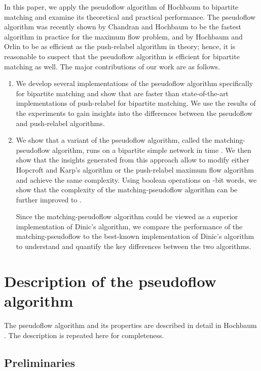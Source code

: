 \documentclass{article}
\newcounter{contribution}
\begin{document}
In this paper, we apply the pseudoflow algorithm of Hochbaum \cite{Hoc97, Hoc07} to bipartite matching and examine its theoretical and practical performance.  The pseudoflow algorithm was recently shown by Chandran and Hochbaum \cite{ChaH07} to be the fastest algorithm in practice for the maximum flow problem, and by Hochbaum and Orlin to be as efficient as the push-relabel algorithm in theory; hence, it is reasonable to suspect that the pseudoflow algorithm is efficient for bipartite matching as well.  The major contributions of our work are as follows.
\begin{enumerate}
\item We develop several implementations of the pseudoflow algorithm specifically for bipartite matching and show that are faster than state-of-the-art implementations of push-relabel for bipartite matching.  We use the results of the experiments to gain insights into the differences between the pseudoflow and push-relabel algorithms. 
\item We show that a variant of the pseudoflow algorithm, called the {\sf matching-pseudoflow} algorithm, runs on a bipartite simple network in time . We then show that the insights generated from this approach allow to modify either Hopcroft and Karp's algorithm or the push-relabel maximum flow algorithm and achieve the same complexity.  Using boolean operations on -bit words, we show that the complexity of the {\sf matching-pseudoflow} algorithm can be further improved to .

Since the {\sf matching-pseudoflow} algorithm could be viewed as a superior implementation of Dinic's algorithm, we compare the performance of the {\sf matching-pseudoflow} to the best-known implementation of Dinic's algorithm to understand and quantify the key differences between the two algorithms. 
\end{enumerate}

\section{Description of the pseudoflow algorithm}
\label{sec:pseudoflow}

The pseudoflow algorithm and its properties are described in detail in
Hochbaum \cite{Hoc07}.  The description is repeated here for
completeness.

\subsection{Preliminaries}
\label{section:prelims}
\end{document}

